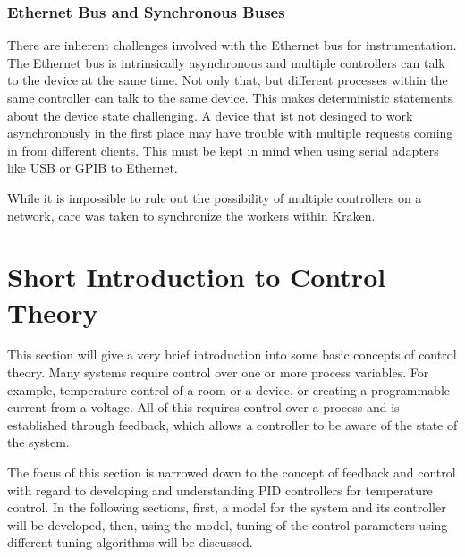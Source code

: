 \subsubsection{Ethernet Bus and Synchronous Buses}
There are inherent challenges involved with the Ethernet bus for instrumentation. The Ethernet bus is intrinsically asynchronous and multiple controllers can talk to the device at the same time. Not only that, but different processes within the same controller can talk to the same device. This makes deterministic statements about the device state challenging. A device that ist not desinged to work asynchronously in the first place may have trouble with multiple requests coming in from different clients. This must be kept in mind when using serial adapters like USB or GPIB to Ethernet.

While it is impossible to rule out the possibility of multiple controllers on a network, care was taken to synchronize the workers within Kraken.

\clearpage
\section{Short Introduction to Control Theory}
This section will give a very brief introduction into some basic concepts of control theory. Many systems require control over one or more process variables. For example, temperature control of a room or a device, or creating a programmable current from a voltage. All of this requires control over a process and is established through feedback, which allows a controller to be aware of the state of the system.

The focus of this section is narrowed down to the concept of feedback and control with regard to developing and understanding PID controllers for temperature control. In the following sections, first, a model for the system and its controller will be developed, then, using the model, tuning of the control parameters using different tuning algorithms will be discussed.


